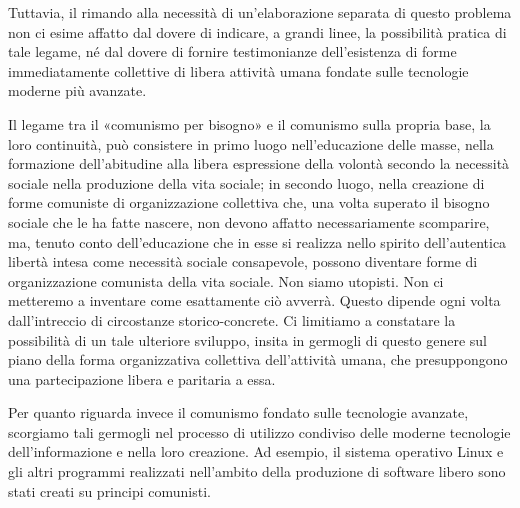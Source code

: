 \documentclass[12pt,a4paper,openany]{book}
\begin{document}
Tuttavia, il rimando alla necessità di un'elaborazione separata di questo problema non ci esime affatto dal dovere di indicare, a grandi linee, la possibilità pratica di tale legame, né dal dovere di fornire testimonianze dell'esistenza di forme immediatamente collettive di libera attività umana fondate sulle tecnologie moderne più avanzate.

Il legame tra il «comunismo per bisogno» e il comunismo sulla propria base, la loro continuità, può consistere in primo luogo nell'educazione delle masse, nella formazione dell'abitudine alla libera espressione della volontà secondo la necessità sociale nella produzione della vita sociale; in secondo luogo, nella creazione di forme comuniste di organizzazione collettiva che, una volta superato il bisogno sociale che le ha fatte nascere, non devono affatto necessariamente scomparire, ma, tenuto conto dell'educazione che in esse si realizza nello spirito dell'autentica libertà intesa come necessità sociale consapevole, possono diventare forme di organizzazione comunista della vita sociale. Non siamo utopisti. Non ci metteremo a inventare come esattamente ciò avverrà. Questo dipende ogni volta dall'intreccio di circostanze storico-concrete. Ci limitiamo a constatare la possibilità di un tale ulteriore sviluppo, insita in germogli di questo genere sul piano della forma organizzativa collettiva dell'attività umana, che presuppongono una partecipazione libera e paritaria a essa.

Per quanto riguarda invece il comunismo fondato sulle tecnologie avanzate, scorgiamo tali germogli nel processo di utilizzo condiviso delle moderne tecnologie dell'informazione e nella loro creazione. Ad esempio, il sistema operativo Linux e gli altri programmi realizzati nell'ambito della produzione di software libero sono stati creati su principi comunisti.
\end{document}
